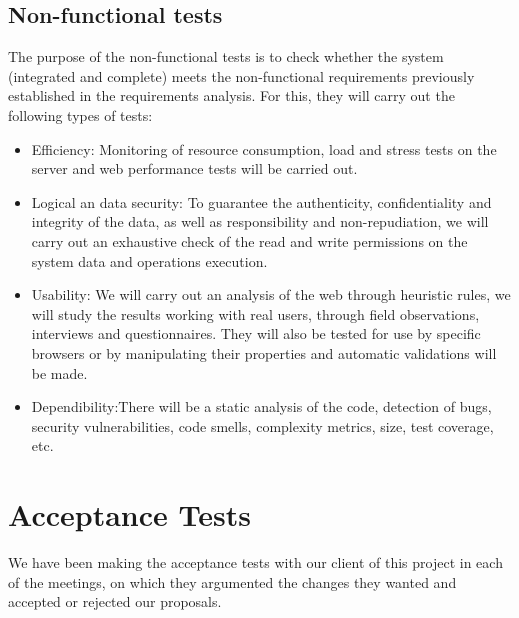 \subsection{Non-functional tests}
The purpose of the non-functional tests is to check whether the system (integrated and complete) meets the non-functional requirements previously established in the requirements analysis. For this, they will carry out the following types of tests:
\begin{itemize}
	\item Efficiency: Monitoring of resource consumption, load and stress tests on the server and web performance tests will be carried out.
	\item Logical an data security: To guarantee the authenticity, confidentiality and integrity of the
	data, as well as responsibility and non-repudiation, we will carry out an exhaustive check of the read and write permissions on the system data and operations execution.
	\item Usability: We will carry out an analysis of the web through heuristic rules, we will study the results working with real users, through field observations, interviews and questionnaires. They will also be tested for use by specific browsers or by manipulating their properties and automatic validations will be made.
	\item Dependibility:There will be a static analysis of the code, detection of bugs, security vulnerabilities, code smells, complexity metrics, size, test coverage, etc.
\end{itemize}

\section{Acceptance Tests}
We have been making the acceptance tests with our client of this project in each of the meetings, on which they argumented the changes they wanted and accepted or rejected our proposals.